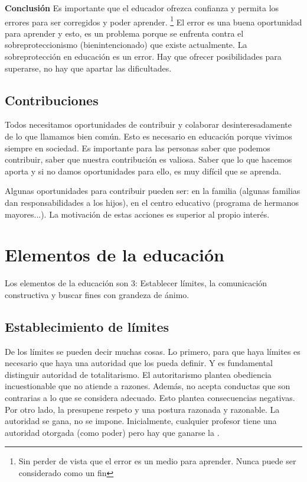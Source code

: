 \documentclass[palatino]{apuntesURJC}
\begin{document}
	\textbf{Conclusión} Es importante que el educador ofrezca confianza y permita los errores para ser corregidos y poder aprender. 
	\footnote{Sin perder de vista que el error es un medio para aprender. Nunca puede ser considerado como un fin}
	El error es una buena oportunidad para aprender y esto, es un problema porque se enfrenta contra el sobreproteccionismo (bienintencionado) que existe actualmente.
	La sobreprotección en educación es un error.
	Hay que ofrecer posibilidades para superarse, no hay que apartar las dificultades.

	\subsection{Contribuciones}
	Todos necesitamos oportunidades de contribuir y colaborar desinteresadamente de lo que llamamos bien común. 
	Esto es necesario en educación porque vivimos siempre en sociedad. 
	Es importante para las personas saber que podemos contribuir, saber que nuestra contribución es valiosa. Saber que lo que hacemos aporta y si no damos oportunidades para ello, es muy difícil que se aprenda.

	Algunas oportunidades para contribuir pueden ser: en la familia (algunas familias dan responsabilidades a los hijos), en el centro educativo (programa de hermanos mayores...).
	La motivación de estas acciones es superior al propio interés.


\section{Elementos de la educación}

Los elementos de la educación son 3: Establecer límites, la comunicación constructiva y buscar fines con grandeza de ánimo.

\subsection{Establecimiento de límites}

De los límites se pueden decir muchas cosas. 
%
Lo primero, para que haya límites es necesario que haya una autoridad que los pueda definir.
%
Y es fundamental distinguir autoridad de totalitarismo.
%
El autoritarismo plantea obediencia incuestionable que no atiende a razones. 
%
Además, no acepta conductas que son contrarias a lo que se considera adecuado.
%
Esto plantea consecuencias negativas.
%
Por otro lado, la  presupene respeto y una postura razonada y razonable.
%
La autoridad se gana, no se impone. 
%
Inicialmente, cualquier profesor tiene una autoridad otorgada (como poder) pero hay que ganarse la .
\end{document}
